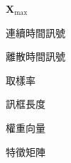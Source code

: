 
\begin{SymEntry}{$\mathbf{X}_{\mathrm{max}}$}
  \item[$x(t)$]  連續時間訊號
  \item[{$x[n]$}]  離散時間訊號
  \item[$f_s$]   取樣率
  \item[$N$]     訊框長度
  \item[$\mathbf{w}$] 權重向量
  \item[$\mathbf{X}$] 特徵矩陣
\end{SymEntry}
